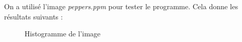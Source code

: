 \documentclass[french,a4paper,10pt]{article}
\begin{document}
	On a utilis\'e l'image \emph{peppers.ppm} pour tester le programme. Cela donne les r\'esultats suivants :
	\begin{figure}[!htb]
		\begin{minipage}{0.48\textwidth}
			\centering
			\caption{Donn\'ees de l'histogramme}\label{Fig:histo-couleur-data}
		\end{minipage}\hfill
		\begin{minipage}{0.48\textwidth}
			\centering
			\caption{Histogramme de l'image}\label{Fig:histo-couleur-plot}
		\end{minipage}
	\end{figure}
\end{document}
